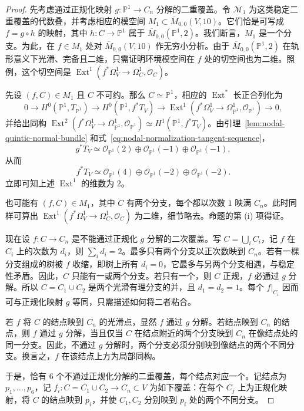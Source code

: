 \begin{proof}
先考虑通过正规化映射 $g:\mathbb P^1\to C_n$ 分解的二重覆盖。令 $\mathcal M_1$ 为这类稳定二重覆盖的代数叠，并考虑相应的模空间 $M_1\subset\overline M_{0,0}(V,10)$。它们恰是可写成 $f=g\circ h$ 的映射，其中 $h:C\to\mathbb P^1$ 属于 $\overline M_{0,0}(\mathbb P^1,2)$。我们断言，$M_1$ 是一个分支。为此，在 $f\in M_1$ 处对 $\overline M_{0,0}(V,10)$ 作无穷小分析。由于 $\overline M_{0,0}(\mathbb P^1,2)$ 在轨形意义下光滑、完备且二维，只需证明环境模空间在 $f$ 处的切空间也为二维。照例，这个切空间是 $\operatorname{Ext}^1(f^*\Omega_V^1\to\Omega_C^1,\mathcal O_C)$。

先设 $(f,C)\in M_1$ 且 $C$ 不可约。那么 $C\simeq\mathbb P^1$，相应的 $\operatorname{Ext}^*$ 长正合列化为
\[
0\longrightarrow H^0(\mathbb P^1,T_{\mathbb P^1})\longrightarrow H^0(\mathbb P^1,f^*T_V)
\longrightarrow\operatorname{Ext}^1(f^*\Omega_V^1\to\Omega_{\mathbb P^1}^1,\mathcal O_{\mathbb P^1})\longrightarrow0,
\]
并给出同构 $\operatorname{Ext}^2(f^*\Omega_V^1\to\Omega_{\mathbb P^1}^1,\mathcal O_{\mathbb P^1})\simeq H^1(\mathbb P^1,f^*T_V)$。由引理~\ref{lem:nodal-quintic-normal-bundle} 和式~\eqref{eq:nodal-normalization-tangent-sequence}，
\[
g^*T_V\simeq\mathcal O_{\mathbb P^1}(2)\oplus\mathcal O_{\mathbb P^1}(-1)\oplus\mathcal O_{\mathbb P^1}(-1),
\]
从而
\[
f^*T_V\simeq\mathcal O_{\mathbb P^1}(4)\oplus\mathcal O_{\mathbb P^1}(-2)\oplus\mathcal O_{\mathbb P^1}(-2).
\]
立即可知上述 $\operatorname{Ext}^1$ 的维数为 $2$。

也可能有 $(f,C)\in M_1$，其中 $C$ 有两个分支，每个都以次数 $1$ 映满 $C_n$。此时同样可算出 $\operatorname{Ext}^1(f^*\Omega_V^1\to\Omega_C^1,\mathcal O_C)$ 为二维，细节略去。命题的第 (i) 项得证。

现在设 $f:C\to C_n$ 是不能通过正规化 $g$ 分解的二次覆盖。写 $C=\bigcup_iC_i$，记 $f$ 在 $C_i$ 上的次数为 $d_i$，则 $\sum_i d_i=2$。最多只有两个分支以正次数映到 $C_n$。若有一棵分支组成的树被 $f$ 收缩，即树上所有 $d_i=0$，它最多与另两个分支相遇，与稳定性矛盾。因此，$C$ 只能有一或两个分支。若只有一个，则 $C$ 正规，$f$ 必通过 $g$ 分解。所以 $C=C_1\cup C_2$ 是两个光滑有理分支的并，且 $d_1=d_2=1$。每个 $f|_{C_i}$ 因而可与正规化映射 $g$ 等同，只需描述如何将二者粘合。

若 $f$ 将 $C$ 的结点映到 $C_n$ 的光滑点，显然 $f$ 通过 $g$ 分解。若结点映到 $C_n$ 的结点，则 $f$ 通过 $g$ 分解，当且仅当 $C$ 在结点附近的两个分支映到 $C_n$ 在像结点处的同一分支。因此，不通过 $g$ 分解时，两个分支必须分别映到像结点的两个不同分支。换言之，$f$ 在该结点上方为局部同构。

于是，恰有 $6$ 个不通过正规化分解的二重覆盖，每个结点对应一个。记结点为 $p_1,\ldots,p_6$，记 $f_i:C=C_1\cup C_2\to C_n\subset V$ 为如下覆盖：在每个 $C_j$ 上为正规化映射，将 $C$ 的结点映到 $p_i$，并使 $C_1,C_2$ 分别映到 $p_i$ 处的两个不同分支。


\end{proof}
